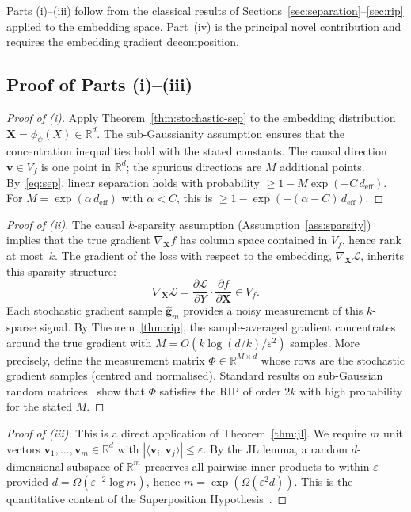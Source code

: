 \documentclass[11pt,a4paper]{article}
\theoremstyle{plain}
\theoremstyle{definition}
\theoremstyle{remark}
\newcommand{\R}{\mathbb{R}}
\newcommand{\cL}{\mathcal{L}}
\newcommand{\deff}{d_{\mathrm{eff}}}
\newcommand{\ip}[2]{\langle #1, #2 \rangle}
\begin{document}
Parts (i)--(iii) follow from the classical results of
Sections~\ref{sec:separation}--\ref{sec:rip} applied to the embedding space.
Part~(iv) is the principal novel contribution and requires the embedding gradient
decomposition.

\subsection{Proof of Parts (i)--(iii)}\label{sec:proof-i-iii}

\begin{proof}[Proof of (i)]
Apply Theorem~\ref{thm:stochastic-sep} to the embedding distribution
$\mathbf{X} = \phi_\psi(X) \in \R^d$.  The sub-Gaussianity assumption ensures
that the concentration inequalities hold with the stated constants.  The causal
direction $\mathbf{v} \in V_f$ is one point in $\R^d$; the spurious directions
are $M$ additional points.  By~\eqref{eq:sep}, linear separation holds with
probability $\geq 1 - M\exp(-C\,\deff)$.  For $M = \exp(\alpha\,\deff)$ with
$\alpha < C$, this is $\geq 1 - \exp(-(\alpha - C)\,\deff)$.
\end{proof}

\begin{proof}[Proof of (ii)]
The causal $k$-sparsity assumption (Assumption~\ref{ass:sparsity}) implies that
the true gradient $\nabla_{\mathbf{X}} f$ has column space contained in $V_f$,
hence rank at most~$k$.  The gradient of the loss with respect to the embedding,
$\nabla_{\mathbf{X}} \cL$, inherits this sparsity structure:
\[
  \nabla_{\mathbf{X}} \cL
  = \frac{\partial\cL}{\partial Y}\cdot \frac{\partial f}{\partial \mathbf{X}}
  \in V_f.
\]
Each stochastic gradient sample $\hat{\mathbf{g}}_m$ provides a noisy measurement
of this $k$-sparse signal.  By Theorem~\ref{thm:rip}, the sample-averaged
gradient concentrates around the true gradient with
$M = O(k\log(d/k)/\varepsilon^2)$ samples.  More precisely, define the
measurement matrix $\Phi \in \R^{M\times d}$ whose rows are the stochastic
gradient samples (centred and normalised).  Standard results on sub-Gaussian
random matrices~\citep[Thm.~9.1.1]{vershynin2018high} show that $\Phi$ satisfies
the RIP of order $2k$ with high probability for the stated $M$.
\end{proof}

\begin{proof}[Proof of (iii)]
This is a direct application of Theorem~\ref{thm:jl}.  We require $m$ unit
vectors $\mathbf{v}_1,\ldots,\mathbf{v}_m \in \R^d$ with
$|\ip{\mathbf{v}_i}{\mathbf{v}_j}| \leq \varepsilon$.  By the JL lemma, a
random $d$-dimensional subspace of $\R^m$ preserves all pairwise inner products
to within $\varepsilon$ provided $d = \Omega(\varepsilon^{-2}\log m)$, hence
$m = \exp(\Omega(\varepsilon^2 d))$.  This is the quantitative content of the
Superposition Hypothesis~\citep{elhage2022superposition}.
\end{proof}
\end{document}
